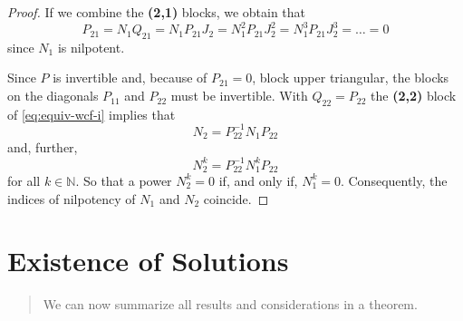 \documentclass[]{book}
\newenvironment {JHSAYS} [0] {\begin{quote}\color{jhsc}} {\end{quote}}
\theoremstyle{definition}
\theoremstyle{definition}
\theoremstyle{definition}
\theoremstyle{definition}
\theoremstyle{remark}
\begin{document}
\begin{proof}
If we combine the \textbf{(2,1)} blocks, we obtain that
\[
P_{21}=N_1Q_{21}=N_1P_{21}J_2=N_1^2P_{21}J_2^2=N_1^3P_{21}J_2^3=\dotsc=0
\]
since \(N_1\) is nilpotent.

Since \(P\) is invertible and, because of \(P_{21}=0\), block upper triangular, the blocks on the diagonals \(P_{11}\) and \(P_{22}\) must be invertible. With \(Q_{22}=P_{22}\) the \textbf{(2,2)} block of \eqref{eq:equiv-wcf-i} implies that
\[
N_2 = P_{22}^{-1}N_1P_{22}
\]
and, further,
\[
N_2^k = P_{22}^{-1}N_1^kP_{22}
\]
for all \(k\in\mathbb N\). So that a power \(N_2^k=0\) if, and only if, \(N_1^k=0\). Consequently, the indices of nilpotency of \(N_1\) and \(N_2\) coincide.
\end{proof}

\hypertarget{existence-of-solutions}{%
\section{Existence of Solutions}\label{existence-of-solutions}}

\begin{JHSAYS}
We can now summarize all results and considerations in a theorem.
\end{JHSAYS}
\end{document}
